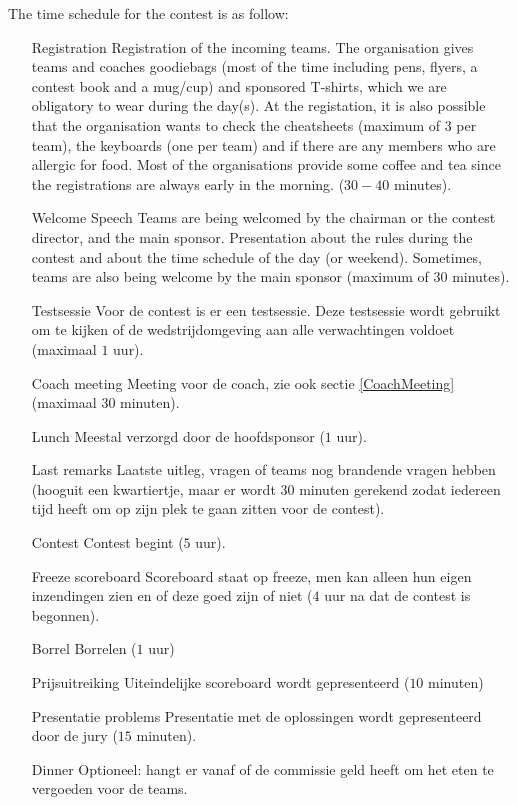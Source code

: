The time schedule for the contest is as follow:
\begin{itemize}
\item[Registration] Registration of the incoming teams. The organisation gives teams and coaches goodiebags (most of the time including pens, flyers, a contest book and a mug/cup) and sponsored T-shirts, which we are obligatory to wear during the day(s). At the registation, it is also possible that the organisation wants to check the cheatsheets (maximum of $3$ per team), the keyboards (one per team) and if there are any members who are allergic for food. Most of the organisations provide some coffee and tea since the registrations are always early in the morning. ($30-40$ minutes).

\item[Welcome Speech] Teams are being welcomed by the chairman or the contest director, and the main sponsor. Presentation about the rules during the contest and about the time schedule of the day (or weekend). Sometimes, teams are also being welcome by the main sponsor (maximum of $30$ minutes).

\item[Testsessie] Voor de contest is er een testsessie. Deze testsessie wordt gebruikt om te kijken of de wedstrijdomgeving aan alle verwachtingen voldoet (maximaal $1$ uur).
\item[Coach meeting] Meeting voor de coach, zie ook sectie \ref{CoachMeeting} (maximaal $30$ minuten).
\item[Lunch] Meestal verzorgd door de hoofdsponsor ($1$ uur).
\item[Last remarks] Laatste uitleg, vragen of teams nog brandende vragen hebben (hooguit een kwartiertje, maar er wordt $30$ minuten gerekend zodat iedereen tijd heeft om op zijn plek te gaan zitten voor de contest).
\item[Contest] Contest begint ($5$ uur).
\item[Freeze scoreboard] Scoreboard staat op freeze, men kan alleen hun eigen inzendingen zien en of deze goed zijn of niet ($4$ uur na dat de contest is begonnen).
\item[Borrel] Borrelen ($1$ uur)
\item[Prijsuitreiking] Uiteindelijke scoreboard wordt gepresenteerd ($10$ minuten)
\item[Presentatie problems] Presentatie met de oplossingen wordt gepresenteerd door de jury ($15$ minuten).
\item[Dinner] Optioneel: hangt er vanaf of de commissie geld heeft om het eten te vergoeden voor de teams.
\end{itemize}